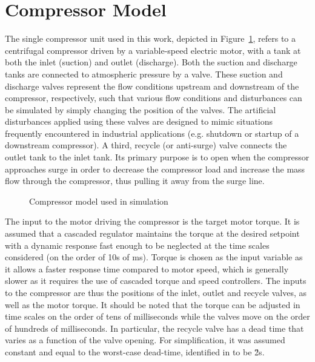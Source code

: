 \section{Compressor Model}
\label{sec:mod:comp}

The single compressor unit used in this work, depicted in Figure~\ref{fig:mod:single_comp}, refers to a centrifugal compressor driven by a variable-speed electric motor, with a tank at both the inlet (suction) and outlet (discharge).
Both the suction and discharge tanks are connected to atmospheric pressure by a valve.
These suction and discharge valves represent the flow conditions upstream and downstream of the compressor, respectively, such that various flow conditions and disturbances can be simulated by simply changing the position of the valves.
The artificial disturbances applied using these valves are designed to mimic situations frequently encountered in industrial applications (e.g. shutdown or startup of a downstream compressor).
A third, recycle (or anti-surge) valve connects the outlet tank to the inlet tank. Its primary purpose is to open when the compressor approaches surge in order to decrease the compressor load and increase the mass flow through the compressor, thus pulling it away from the surge line.

\begin{figure}
  \centering
  \resizebox{0.7\linewidth}{!}{%
    \begin{tikzpicture}
      \drawcomp
    \end{tikzpicture}
  }
  \caption{Compressor model used in simulation}
  \label{fig:mod:single_comp}
\end{figure}


The input to the motor driving the compressor is the target motor torque.
It is assumed that a cascaded regulator maintains the torque at the desired setpoint with a dynamic response fast enough to be neglected at the time scales considered (on the order of 10s of ms).
Torque is chosen as the input variable as it allows a faster response time compared to motor speed, which is generally slower as it requires the use of cascaded torque and speed controllers.
The inputs to the compressor are thus the positions of the inlet, outlet and recycle valves, as well as the motor torque.
It should be noted that the torque can be adjusted in time scales on the order of tens of milliseconds while the valves move on the order of hundreds of milliseconds.
In particular, the recycle valve has a dead time that varies as a function of the valve opening. For simplification, it was assumed constant and equal to the worst-case dead-time, identified in \cite{Cortinovis2015} to be \u{2}{s}.


